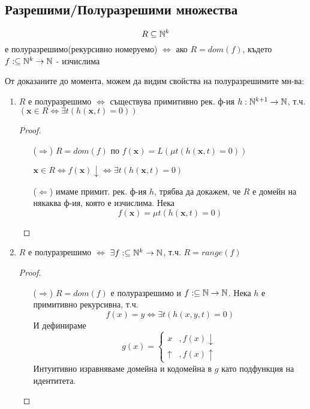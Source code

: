 \subsection{Разрешими/Полуразрешими множества}
\begin{definition}
    \begin{equation*}
        R \subseteq {\mathbb{N}}^k
    \end{equation*}
    е полуразрешимо(рекурсивно номеруемо) $\iff$ ако $R = dom(f)$, където $f: \subseteq {\mathbb{N}}^k \to {\mathbb{N}}$ - изчислима
\end{definition}
\begin{corollary}
От доказаните до момента, можем да видим свойства на полуразрешимите мн-ва:
    \begin{enumerate}
        \item $R$ е полуразрешимо $\iff$ съществува примитивно рек. ф-ия $h: {\mathbb{N}}^{k+1} \to {\mathbb{N}}$, т.ч. $\left(\textbf{x} \in R \iff \exists t( h(\textbf{x}, t ) = 0)\right)$
        
        \begin{proof}
        \begin{itemize}
            \item[($\Rightarrow$)] $R=dom(f)$ по  $f(\textbf{x}) = L(\mu t (h(\textbf{x}, t) = 0))$

            $\textbf{x} \in R \iff f(\textbf{x})\downarrow \iff \exists t (h(\textbf{x}, t) = 0)$

            \item[($\Leftarrow$)] имаме примит. рек. ф-ия $h$, трябва да докажем, че $R$ е домейн на някаква ф-ия, която е изчислима. Нека
            \begin{equation*}
                f(\textbf{x}) = \mu t ( h( \textbf{x}, t ) = 0 )
            \end{equation*}
        \end{itemize}
        \end{proof}
        \item $R$ е полуразрешимо $\iff$ $\exists f: \subseteq {\mathbb{N}}^k \to {\mathbb{N}}$, т.ч. $R = range(f)$
        
        \begin{proof}
        \begin{itemize}
            \item[($\Rightarrow$)] $R = dom(f)$ е полуразрешимо и $f: \subseteq {\mathbb{N}} \to {\mathbb{N}}$. Нека $h$ е примитивно рекурсивна, т.ч.
            \begin{equation*}
                f(x) = y \iff \exists t ( h(x, y, t) = 0 ) 
            \end{equation*}
            И дефинираме
            \begin{equation*}
                g(x) = \begin{cases}
                    x &, f(x) \downarrow \\
                    \uparrow &, f(x) \uparrow
                \end{cases}
            \end{equation*}
            Интуитивно изравняваме домейна и кодомейна в $g$ като подфункция на идентитета.


\end{itemize}
\end{proof}
\end{enumerate}
\end{corollary}
